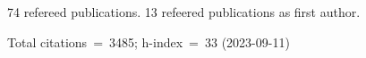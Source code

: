 74 refereed publications. 13 refeered publications as first author.

Total citations~=~3485; h-index~=~33 (2023-09-11)
